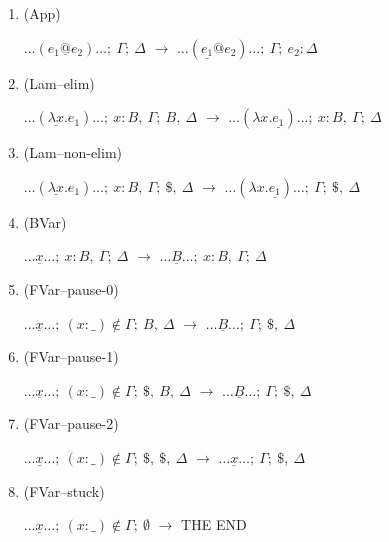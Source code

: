\documentclass[a4paper, 10pt]{article}
\begin{document}
\begin{enumerate}
\item (App)

$\dots (e_1 \underline{@} e_2) \dots;\ \Gamma;\ \Delta$
$\longrightarrow$
$\dots (\underline{e_1} @ e_2) \dots;\ \Gamma;\ e_2:\Delta$

\item (Lam--elim)

$\dots (\underline{\lambda x} . e_1) \dots;\ x:B,\ \Gamma;\ B,\ \Delta$
$\longrightarrow$
$\dots (\lambda x . \underline{e_1}) \dots;\ x:B,\ \Gamma;\ \Delta$

\item (Lam--non-elim)

$\dots (\underline{\lambda x} . e_1) \dots;\ x:B,\ \Gamma;\ \$,\ \Delta$
$\longrightarrow$
$\dots (\lambda x . \underline{e_1}) \dots;\ \Gamma;\ \$,\ \Delta$

\item (BVar)

$\dots \underline{x} \dots;\ x:B,\ \Gamma;\ \Delta$
$\longrightarrow$
$\dots \underline{B} \dots;\ x:B,\ \Gamma;\ \Delta$

\item (FVar--pause-0)

$\dots \underline{x} \dots;\ (x:\_) \not\in \Gamma;\ B,\ \Delta$
$\longrightarrow$
$\dots \underline{B} \dots;\ \Gamma;\ \$,\ \Delta$

\item (FVar--pause-1)

$\dots \underline{x} \dots;\ (x:\_) \not\in \Gamma;\ \$,\ B,\ \Delta$
$\longrightarrow$
$\dots \underline{B} \dots;\ \Gamma;\ \$,\ \Delta$

\item (FVar--pause-2)

$\dots \underline{x} \dots;\ (x:\_) \not\in \Gamma;\ \$,\ \$,\ \Delta$
$\longrightarrow$
$\dots \underline{x} \dots;\ \Gamma;\ \$,\ \Delta$

\item (FVar--stuck)

$\dots \underline{x} \dots;\ (x:\_) \not\in \Gamma;\ \emptyset$
$\longrightarrow$
THE END

\end{enumerate}
\end{document}
